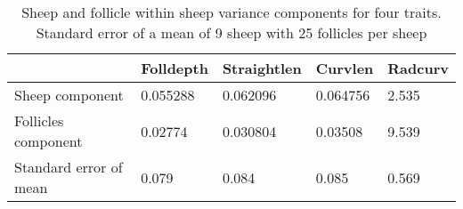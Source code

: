 %

\begin{table}[ht]
\centering
\caption{Sheep and follicle within sheep variance components for four traits. Standard error of a mean of 9 sheep with 25 follicles per sheep}
\label{tab:se}
\vspace{0.1in}
\begin{tabular}{|p{1.6in}|p{0.6in}|p{0.6in}|p{0.6in}|p{0.6in}|} \hline
   & Folldepth & Straightlen & Curvlen  & Radcurv\\   
    \hline
 Sheep component & 0.055288 & 0.062096 & 0.064756 & 2.535 \\
 Follicles component & 0.02774 & 0.030804 & 0.03508 & 9.539\\
 Standard error of mean & 0.079 & 0.084 & 0.085 & 0.569\\
   \hline
\end{tabular}
\end{table}

%


